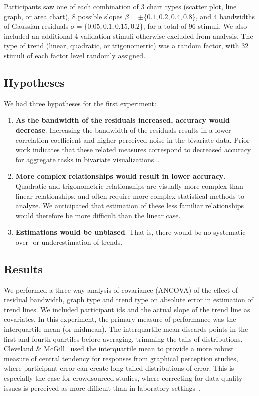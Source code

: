 \documentclass{sigchi}
\begin{document}
Participants saw one of each combination of 3 chart types (scatter plot, line graph, or area chart), 8 possible slopes $\beta = \pm \{0.1,0.2,0.4,0.8\}$, and 4 bandwidths of Gaussian residuals $\sigma = \{0.05,0.1,0.15,0.2\}$, for a total of 96 stimuli. We also included an additional 4 validation stimuli otherwise excluded from analysis. The type of trend (linear, quadratic, or trigonometric) was a random factor, with 32 stimuli of each factor level randomly assigned.

\subsection{Hypotheses}

We had three hypotheses for the first experiment:
\begin{enumerate}
	\item \textbf{As the bandwidth of the residuals increased, accuracy would decrease}. Increasing the bandwidth of the residuals results in a lower correlation coefficient and higher perceived noise in the bivariate data. Prior work indicates that these related measures correspond to decreased accuracy for aggregate tasks in bivariate visualizations~\cite{albers2014task, harrison2014ranking}.
	\item \textbf{More complex relationships would result in lower accuracy}. Quadratic and trigonometric relationships are visually more complex than linear relationships, and often require more complex statistical methods to analyze. We anticipated that estimation of these less familiar relationships would therefore be more difficult than the linear case.
	\item \textbf{Estimations would be unbiased}. That is, there would be no systematic over- or underestimation of trends.
\end{enumerate}

\subsection{Results}

\expOnesigmasFig

\expOnetypesFig

We performed a three-way analysis of covariance (ANCOVA) of the effect of residual bandwidth, graph type and trend type on absolute error in estimation of trend lines. We included participant ids and the actual slope of the trend line as covariates. In this experiment, the primary measure of performance was the interquartile mean (or midmean). The interquartile mean discards points in the first and fourth quartiles before averaging, trimming the tails of distributions. Cleveland \& McGill~\cite{cleveland1984graphical} used the interquartile mean to provide a more robust measure of central tendency for responses from graphical perception studies, where participant error can create long tailed distributions of error. This is especially the case for crowdsourced studies, where correcting for data quality issues is perceived as more difficult than in laboratory settings~\cite{heer2010crowdsourcing}.
\end{document}
